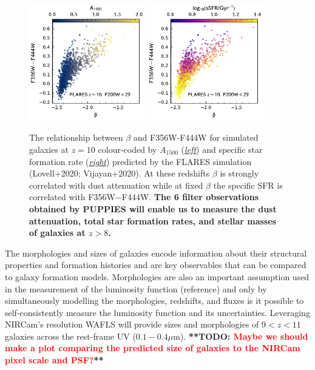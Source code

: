 \documentclass[12pt]{article}
\newcommand{\todo}[1]{\textbf{**TODO: \textcolor{red}{#1}**}}
\begin{document}
\begin{figure}[h!]
    \centering
    \includegraphics[width=0.45\textwidth]{figs/beta_A1500.pdf}
    \includegraphics[width=0.45\textwidth]{figs/beta_sSFR.pdf}
    \caption{The relationship between $\beta$ and F356W-F444W for simulated galaxies at $z=10$ colour-coded by $A_{1500}$ (\emph{\underline{left}}) and specific star formation rate (\emph{\underline{right}}) predicted by the FLARES simulation (Lovell+2020; Vijayan+2020). At these redshifts $\beta$ is strongly correlated with dust attenuation while at fixed $\beta$ the specific SFR is correlated with F356W$-$F444W. \textbf{The 6 filter observations obtained by PUPPIES will enable us to measure the dust attenuation, total star formation rates, and stellar masses of galaxies at $z>8$.}}
    \label{fig:beta}
\end{figure}



The morphologies and sizes of galaxies encode information about their structural properties and formation histories and are key observables that can be compared to galaxy formation models. Morphologies are also an important assumption used in the measurement of the luminosity function (reference) and only by simultaneously modelling the morphologies, redshifts, and fluxes is it possible to self-consistently measure the luminosity function and its uncertainties. Leveraging NIRCam's resolution WAFLS will provide sizes and morphologies of $9<z<11$ galaxies across the rest-frame UV ($0.1-0.4\mu$m). \todo{Maybe we should make a plot comparing the predicted size of galaxies to the NIRCam pixel scale and PSF?}
\end{document}
